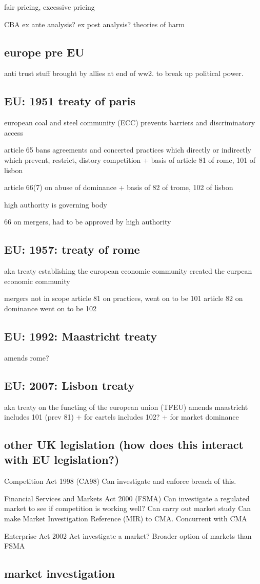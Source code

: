 fair pricing, excessive pricing

CBA
ex ante analysis?
ex post analysis?
theories of harm
\subsection{europe pre EU}
anti trust stuff brought by allies at end of ww2. to break up political power.
\subsection{EU: 1951 treaty of paris}
european coal and steel community (ECC)
prevents barriers and discriminatory access

article 65 bans agreements and concerted practices which directly or indirectly which prevent, restrict, distory competition
+ basis of article 81 of rome, 101 of lisbon

article 66(7) on abuse of dominance
+ basis of 82 of trome, 102 of lisbon

high authority is governing body

66 on mergers, had to be approved by high authority
\subsection{EU: 1957: treaty of rome}
aka treaty establishing the european economic community
created the eurpean economic community

mergers not in scope
article 81 on practices, went on to be 101
article 82 on dominance
went on to be 102
\subsection{EU: 1992: Maastricht treaty}
amends rome?
\subsection{EU: 2007: Lisbon treaty}
aka treaty on the functing of the european union (TFEU)
amends maastricht
includes 101 (prev 81)
+ for cartels
includes 102?
+ for market dominance
\subsection{other UK legislation (how does this interact with EU legislation?)}

Competition Act 1998 (CA98)
Can investigate and enforce breach of this.

Financial Services and Markets Act 2000 (FSMA)
Can investigate a regulated market to see if competition is working well?
Can carry out market study
Can make Market Investigation Reference (MIR) to CMA.
Concurrent with CMA

Enterprise Act 2002
Act investigate a market? Broader option of markets than FSMA


\subsection{market investigation}

